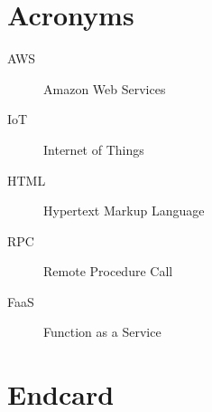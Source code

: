 \documentclass[../main.tex]{subfiles}
\begin{document}
\chapter{Acronyms}

\begin{description}
  \item[AWS] Amazon Web Services
  \item[IoT] Internet of Things
  \item[HTML] Hypertext Markup Language
  \item[RPC] Remote Procedure Call
  \item[FaaS] Function as a Service
\end{description}

\chapter{Endcard}
\end{document}
